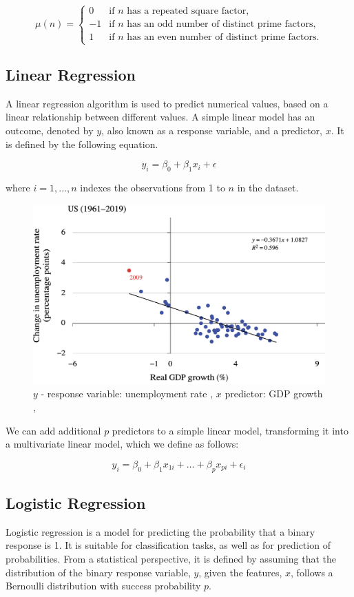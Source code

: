 \documentclass[../main.tex]{subfiles}
\begin{document}
	\[
	\mu(n) = \begin{cases}
		0 & \text{if } n \text{ has a repeated square factor}, \\
		-1 & \text{if } n \text{ has an odd number of distinct prime factors}, \\
		1 & \text{if } n \text{ has an even number of distinct prime factors}.
	\end{cases}
	\]
	
	\subsection{Linear Regression}
	\noindent A linear regression algorithm is used to predict numerical values, based on a linear relationship between different values. A simple linear model has an outcome, denoted by $y$, also known as a response variable,  and a predictor, $x$. It is defined by the following equation.
	
	$$ y_i= \beta_0 + \beta_1 x_i + \epsilon $$

	 \noindent where $ i = 1, ..., n$  indexes the observations from 1 to $n$ in the dataset.

	\begin{figure}[h]
		\centering
		\includegraphics[width=0.6\linewidth]{imgs/gdp.png}
		 \caption{\small $y$ - response variable: unemployment rate , $x$ predictor: GDP growth , } 
	\end{figure} \mbox{} \par

\noindent We can add additional $p$ predictors to a simple linear model, transforming it into a multivariate linear model, which we define as follows:

$$y_i = \beta_0 + \beta_1x_{1i} + \ldots + \beta_px_{pi} + \epsilon_i $$

\subsection{Logistic Regression}
\noindent Logistic regression is a model for predicting the probability that a binary response is 1.  It is suitable for classification tasks, as well as for prediction of probabilities.  From a statistical perspective, it is defined by assuming that the distribution of the binary response variable, $y$, given the features, $x$, follows a Bernoulli
distribution with success probability $p$. 
\end{document}
